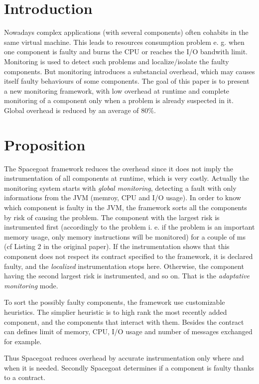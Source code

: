 \section{Introduction}

Nowadays complex applications (with several components) often cohabits in the same virtual machine. This leads to resources consumption problem e. g. when one component is faulty and burns the CPU or reaches the I/O bandwith limit. Monitoring is used to detect such problems and localize/isolate the faulty components. But monitoring introduces a substancial overhead, which may causes itself faulty behaviours of some components. The goal of this paper is to present a new monitoring framework, with low overhead at runtime and complete monitoring of a component only when a problem is already suspected in it. Global overhead is reduced by an average of 80\%.

\section{Proposition}

The \textsf{Spacegoat} framework reduces the overhead since it does not imply the instrumentation of all components at runtime, which is very costly. Actually the monitoring system starts with \emph{global monitoring}, detecting a fault with only informations from the JVM (memroy, CPU and I/O usage). In order to know which component is faulty in the JVM, the framework sorts all the components by risk of causing the problem. The component with the largest risk is instrumented first (accordingly to the problem i. e. if the problem is an important memory usage, only memory instructions will be monitored) for a couple of ms (cf Listing 2 in the original paper). If the instrumentation shows that this component does not respect its contract specified to the framework, it is declared faulty, and the \emph{localized} instrumentation stops here. Otherwise, the component having the second largest risk is instrumented, and so on. That is the \emph{adaptative monitoring} mode.

To sort the possibly faulty components, the framework use customizable heuristics. The simplier heuristic is to high rank the most recently added component, and the components that interact with them. Besides the contract can defines limit of memory, CPU, I/O usage and number of messages exchanged for example.

Thus \textsf{Spacegoat} reduces overhead by accurate instrumentation only where and when it is needed. Secondly \textsf{Spacegoat} determines if a component is faulty thanks to a contract. 

